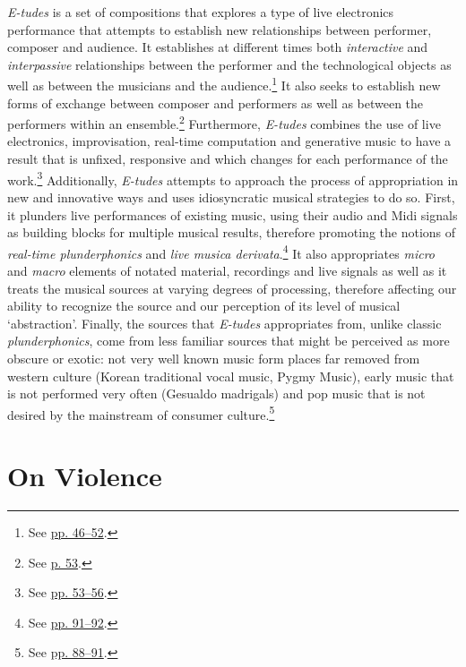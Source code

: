 \emph{E-tudes} is a set of compositions that explores a type of live electronics performance that attempts to establish new relationships between performer, composer and audience. It establishes at different times both \emph{interactive} and \emph{interpassive} relationships between the performer and the technological objects as well as between the musicians and the audience.\footnote{See \hyperlink{relaudience}{pp. 46--52}.} It also seeks to establish new forms of exchange between composer and performers as well as between the performers within an ensemble.\footnote{See \hyperlink{ensembledy}{p. 53}.} Furthermore, \emph{E-tudes} combines the use of live electronics, improvisation, real-time computation and generative music to have a result that is unfixed, responsive and which changes for each performance of the work.\footnote{See \hyperlink{techcomp}{pp. 53--56}.} Additionally, \emph{E-tudes} attempts to approach the process of appropriation in new and innovative ways and uses idiosyncratic musical strategies to do so. First, it plunders live performances of existing music, using their audio and Midi signals as building blocks for multiple musical results, therefore promoting the notions of \emph{real-time plunderphonics} and \emph{live musica derivata}.\footnote{See \hyperlink{realtimeplunderfuck}{pp. 91--92}.} It also appropriates \emph{micro} and \emph{macro} elements of notated material, recordings and live signals as well as it treats the musical sources at varying degrees of processing, therefore affecting our ability to recognize the source and our perception of its level of musical `abstraction'. Finally, the sources that \emph{E-tudes} appropriates from, unlike classic \emph{plunderphonics}, come from less familiar sources that might be perceived as more obscure or exotic: not very well known music form places far removed from western culture (Korean traditional vocal music, Pygmy Music), early music that is not performed very often (Gesualdo madrigals) and pop music that is not desired by the mainstream of consumer culture.\footnote{See \hyperlink{appropstrat}{pp. 88--91}.}

\section{On Violence}
 
